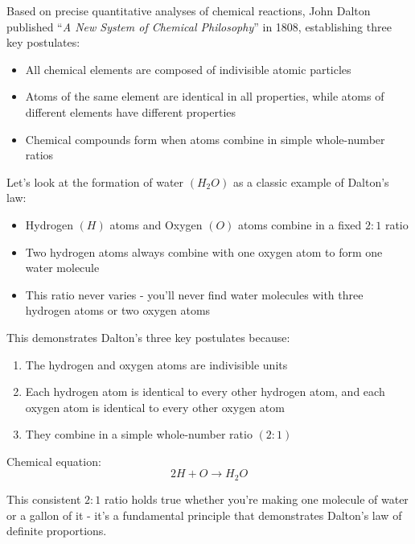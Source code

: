 \documentclass[
  a4paper,
]{book}
\providecommand{\tightlist}{%
  \setlength{\itemsep}{0pt}\setlength{\parskip}{0pt}}
\begin{document}
Based on precise quantitative analyses of chemical reactions, John
Dalton published ``\emph{A New System of Chemical Philosophy}'' in 1808,
establishing three key postulates:

\begin{itemize}
\tightlist
\item
  All chemical elements are composed of indivisible atomic particles
\item
  Atoms of the same element are identical in all properties, while atoms
  of different elements have different properties
\item
  Chemical compounds form when atoms combine in simple whole-number
  ratios
\end{itemize}

\begin{tcolorbox}[enhanced jigsaw, coltitle=black, title=\textcolor{quarto-callout-note-color}{\faInfo}\hspace{0.5em}{Example: Formation of Water \((H_2O)\)}, colframe=quarto-callout-note-color-frame, toprule=.15mm, opacitybacktitle=0.6, left=2mm, opacityback=0, breakable, toptitle=1mm, bottomtitle=1mm, leftrule=.75mm, arc=.35mm, titlerule=0mm, colbacktitle=quarto-callout-note-color!10!white, rightrule=.15mm, bottomrule=.15mm, colback=white]

Let's look at the formation of water \((H_2O)\) as a classic example of
Dalton's law:

\begin{itemize}
\tightlist
\item
  Hydrogen \((H)\) atoms and Oxygen \((O)\) atoms combine in a fixed
  \(2:1\) ratio
\item
  Two hydrogen atoms always combine with one oxygen atom to form one
  water molecule
\item
  This ratio never varies - you'll never find water molecules with three
  hydrogen atoms or two oxygen atoms
\end{itemize}

This demonstrates Dalton's three key postulates because:

\begin{enumerate}
\def\labelenumi{\arabic{enumi}.}
\tightlist
\item
  The hydrogen and oxygen atoms are indivisible units
\item
  Each hydrogen atom is identical to every other hydrogen atom, and each
  oxygen atom is identical to every other oxygen atom
\item
  They combine in a simple whole-number ratio \((2:1)\)
\end{enumerate}

Chemical equation: \[2H + O \rightarrow H_2O\]

This consistent \(2:1\) ratio holds true whether you're making one
molecule of water or a gallon of it - it's a fundamental principle that
demonstrates Dalton's law of definite proportions.

\end{tcolorbox}
\end{document}
